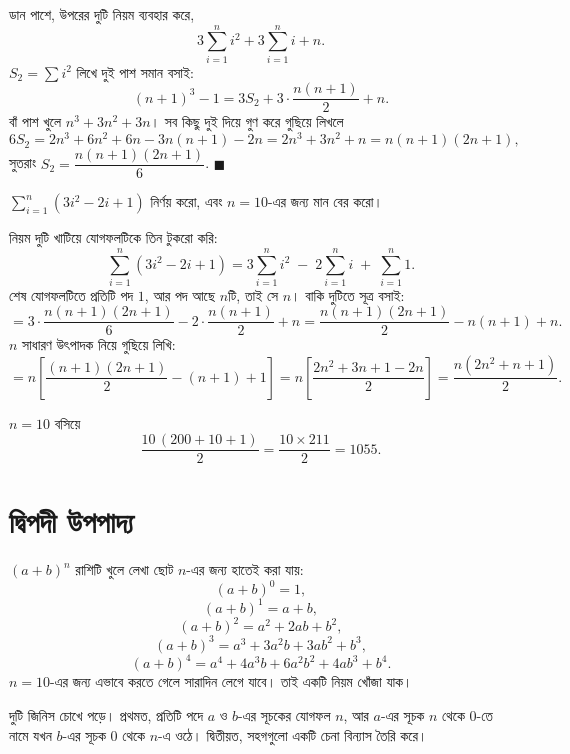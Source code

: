 \documentclass[11pt]{article}
\begin{document}
ডান পাশে, উপরের দুটি নিয়ম ব্যবহার করে,
\[
  3 \sum_{i=1}^{n} i^{2} + 3 \sum_{i=1}^{n} i + n .
\]
$S_2 = \sum i^{2}$ লিখে দুই পাশ সমান বসাই:
\[
  (n+1)^{3} - 1 = 3 S_2 + 3 \cdot \frac{n(n+1)}{2} + n .
\]
বাঁ পাশ খুলে $n^{3} + 3n^{2} + 3n$। সব কিছু দুই দিয়ে গুণ করে গুছিয়ে লিখলে
\[
  6 S_2 = 2n^{3} + 6n^{2} + 6n - 3n(n+1) - 2n
        = 2n^{3} + 3n^{2} + n
        = n(n+1)(2n+1) ,
\]
সুতরাং $S_2 = \dfrac{n(n+1)(2n+1)}{6}$. $\blacksquare$

\begin{example}
$\displaystyle \sum_{i=1}^{n} (3i^{2} - 2i + 1)$ নির্ণয় করো, এবং $n = 10$-এর
জন্য মান বের করো।
\end{example}

\begin{solbox}
নিয়ম দুটি খাটিয়ে যোগফলটিকে তিন টুকরো করি:
\[
  \sum_{i=1}^{n} (3i^{2} - 2i + 1)
  = 3 \sum_{i=1}^{n} i^{2} \;-\; 2 \sum_{i=1}^{n} i \;+\; \sum_{i=1}^{n} 1 .
\]
শেষ যোগফলটিতে প্রতিটি পদ $1$, আর পদ আছে $n$টি, তাই সে $n$। বাকি দুটিতে সূত্র
বসাই:
\[
  = 3 \cdot \frac{n(n+1)(2n+1)}{6} - 2 \cdot \frac{n(n+1)}{2} + n
  = \frac{n(n+1)(2n+1)}{2} - n(n+1) + n .
\]
$n$ সাধারণ উৎপাদক নিয়ে গুছিয়ে লিখি:
\[
  = n \left[ \frac{(n+1)(2n+1)}{2} - (n+1) + 1 \right]
  = n \left[ \frac{2n^{2} + 3n + 1 - 2n}{2} \right]
  = \frac{n(2n^{2} + n + 1)}{2} .
\]

$n = 10$ বসিয়ে
\[
  \frac{10\,(200 + 10 + 1)}{2} = \frac{10 \times 211}{2} = 1055 .
\]
\end{solbox}

\section{দ্বিপদী উপপাদ্য}

$(a+b)^{n}$ রাশিটি খুলে লেখা ছোট $n$-এর জন্য হাতেই করা যায়:
\[
  (a+b)^{0} = 1 ,
\]
\[
  (a+b)^{1} = a + b ,
\]
\[
  (a+b)^{2} = a^{2} + 2ab + b^{2} ,
\]
\[
  (a+b)^{3} = a^{3} + 3a^{2}b + 3ab^{2} + b^{3} ,
\]
\[
  (a+b)^{4} = a^{4} + 4a^{3}b + 6a^{2}b^{2} + 4ab^{3} + b^{4} .
\]
$n = 10$-এর জন্য এভাবে করতে গেলে সারাদিন লেগে যাবে। তাই একটি নিয়ম খোঁজা যাক।

দুটি জিনিস চোখে পড়ে। প্রথমত, প্রতিটি পদে $a$ ও $b$-এর সূচকের যোগফল $n$, আর
$a$-এর সূচক $n$ থেকে $0$-তে নামে যখন $b$-এর সূচক $0$ থেকে $n$-এ ওঠে। দ্বিতীয়ত,
সহগগুলো একটি চেনা বিন্যাস তৈরি করে।
\end{document}
